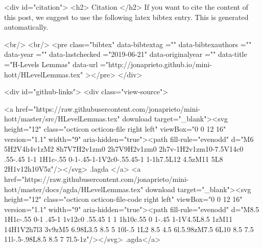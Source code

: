   
  <div id="citation">
  <h2> Citation </h2>
  If you want to cite the content of this post,
  we suggest to use the following latex bibtex entry.
  This is generated automatically.

  <br/>
  <br/>
  <pre class="bibtex"
       data-bibtextag =""
       data-bibtexauthors =""
       data-year =""
       data-lastchecked ="2019-06-21"
       data-originalyear =""
       data-title ="H-Levels Lemmas"
       data-url ="http://jonaprieto.github.io/mini-hott/HLevelLemmas.tex"
  ></pre>
  </div>
  

  <div id="github-links">
    <div class="view-source">
      
        <a href="https://raw.githubusercontent.com/jonaprieto/mini-hott/master/src/HLevelLemmas.tex" download target="_blank"><svg height="12" class="octicon octicon-file right left" viewBox="0 0 12 16" version="1.1" width="9" aria-hidden="true"><path fill-rule="evenodd" d="M6 5H2V4h4v1zM2 8h7V7H2v1zm0 2h7V9H2v1zm0 2h7v-1H2v1zm10-7.5V14c0 .55-.45 1-1 1H1c-.55 0-1-.45-1-1V2c0-.55.45-1 1-1h7.5L12 4.5zM11 5L8 2H1v12h10V5z"/></svg> .lagda </a>
        <a href="https://raw.githubusercontent.com/jonaprieto/mini-hott/master/docs/agda/HLevelLemmas.tex" download target="_blank"><svg height="12" class="octicon octicon-file-code right left" viewBox="0 0 12 16" version="1.1" width="9" aria-hidden="true"><path fill-rule="evenodd" d="M8.5 1H1c-.55 0-1 .45-1 1v12c0 .55.45 1 1 1h10c.55 0 1-.45 1-1V4.5L8.5 1zM11 14H1V2h7l3 3v9zM5 6.98L3.5 8.5 5 10l-.5 1L2 8.5 4.5 6l.5.98zM7.5 6L10 8.5 7.5 11l-.5-.98L8.5 8.5 7 7l.5-1z"/></svg> .agda</a>
      
